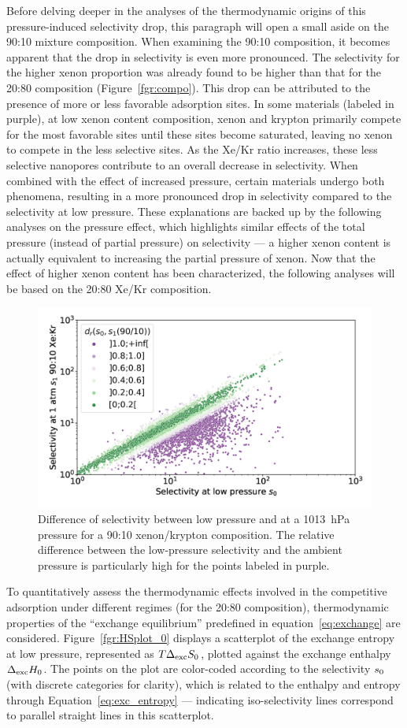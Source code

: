 \documentclass[main.tex]{subfiles}
\begin{document}
Before delving deeper in the analyses of the thermodynamic origins of this pressure-induced selectivity drop, this paragraph will open a small aside on the 90:10 mixture composition.
When examining the 90:10 composition, it becomes apparent that the drop in selectivity is even more pronounced. The selectivity for the higher xenon proportion was already found to be higher than that for the 20:80 composition (Figure~\ref{fgr:compo}). This drop can be attributed to the presence of more or less favorable adsorption sites. In some materials (labeled in purple), at low xenon content composition, xenon and krypton primarily compete for the most favorable sites until these sites become saturated, leaving no xenon to compete in the less selective sites. As the Xe/Kr ratio increases, these less selective nanopores contribute to an overall decrease in selectivity. When combined with the effect of increased pressure, certain materials undergo both phenomena, resulting in a more pronounced drop in selectivity compared to the selectivity at low pressure. These explanations are backed up by the following analyses on the pressure effect, which highlights similar effects of the total pressure (instead of partial pressure) on selectivity --- a higher xenon content is actually equivalent to increasing the partial pressure of xenon. Now that the effect of higher xenon content has been characterized, the following analyses will be based on the 20:80 Xe/Kr composition.

\begin{figure}[t]
  \centering
    \includegraphics[width=0.6\linewidth]{figures/2-thermo/s_0_vs_s_9010_overview_log.jpg}
    \caption{Difference of selectivity between low pressure and at a \SI{1013}{\hecto\pascal} pressure for a 90:10 xenon/krypton composition. The relative difference between the low-pressure selectivity and the ambient pressure is particularly high for the points labeled in purple.}\label{fgr:overview_9010}
\end{figure}

To quantitatively assess the thermodynamic effects involved in the competitive adsorption under different regimes (for the 20:80 composition), thermodynamic properties of the ``exchange equilibrium'' predefined in equation~\ref{eq:exchange} are considered. Figure~\ref{fgr:HSplot_0} displays a scatterplot of the exchange entropy at low pressure, represented as $T\Delta_{\text{exc}}S_{\text{0}}$, plotted against the exchange enthalpy $\Delta_{\text{exc}}H_{\text{0}}$. The points on the plot are color-coded according to the selectivity $s_{\text{0}}$ (with discrete categories for clarity), which is related to the enthalpy and entropy through Equation~\ref{eq:exc_entropy} --- indicating iso-selectivity lines correspond to parallel straight lines in this scatterplot.
  
\end{document}
